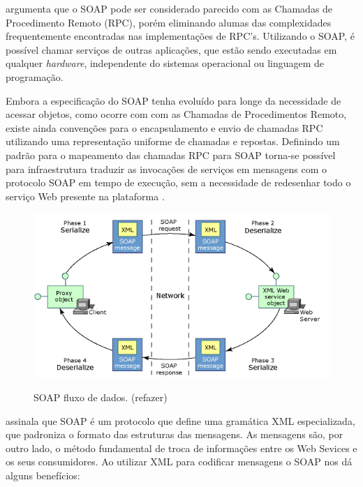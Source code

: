  argumenta que o SOAP pode ser considerado parecido com as Chamadas de Procedimento Remoto (RPC), porém eliminando alumas das complexidades frequentemente encontradas nas implementações de RPC's. Utilizando o SOAP, é possível chamar serviços de outras aplicações, que estão sendo executadas em qualquer \textit{hardware}, independente do sistemas operacional ou linguagem de programação.

Embora a especificação do SOAP tenha evoluído para longe da necessidade de acessar objetos, como ocorre com com as Chamadas de Procedimentos Remoto, existe ainda convenções para o encapsulamento e envio de chamadas RPC utilizando uma representação uniforme de chamadas e repostas. Definindo um padrão para o mapeamento das chamadas RPC para SOAP torna-se possível para infraestrutura traduzir as invocações de serviços em mensagens com o protocolo SOAP em tempo de execução, sem a necessidade de redesenhar todo o serviço Web presente na plataforma \cite{soap-microsoft}.

\begin{figure}[htbp]
\centering
\includegraphics[width=1\textwidth]{figuras/soap-st.png}
\label{fig:soap}
\caption{SOAP fluxo de dados. (refazer)}
\author{https://msdn.microsoft.com/en-us/library/x05s00wz(v=vs.80).aspx}
\end{figure}

\pagebreak


 assinala que SOAP é um protocolo que define uma gramática XML especializada, que padroniza o formato das estruturas das mensagens. As mensagens são, por outro lado, o método fundamental de troca de informações entre os Web Sevices e os seus consumidores. Ao utilizar XML para codificar mensagens o SOAP nos dá alguns benefícios:

